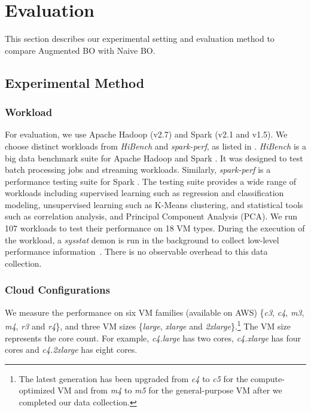 


\section{Evaluation}
\label{sec:evaluation}

This section describes our experimental setting and evaluation method to compare Augmented BO with Naive BO.
\subsection{Experimental Method}
\label{sec:experiment}

\subsubsection*{Workload}
For evaluation, we use Apache Hadoop (v2.7) and Spark (v2.1 and v1.5).
We choose distinct workloads from \emph{HiBench} and \emph{spark-perf}, as listed in \mytable{\ref{tab:dataset}}.
\emph{HiBench} is a big data benchmark suite for Apache Hadoop and Spark \cite{hibench}.
It was designed to test batch processing jobs and streaming workloads. Similarly, \emph{spark-perf} is a performance testing suite for Spark \cite{sparkperf}.
The testing suite provides a wide range of workloads including
supervised learning such as regression and classification modeling,
unsupervised learning such as K-Means clustering,
and statistical tools such as correlation analysis, and Principal Component Analysis (PCA).
We run 107 workloads to test their performance on 18 VM types.
During the execution of the workload, a \emph{sysstat} demon is run in the background to collect low-level performance information~\cite{sysstat}.
There is no observable overhead to this data collection.



\subsubsection*{Cloud Configurations}
We measure the performance on six VM families (available on AWS)
\{\emph{c3}, \emph{c4}, \emph{m3}, \emph{m4}, \emph{r3} and \emph{r4}\}, and
three VM sizes \{\emph{large}, \emph{xlarge} and \emph{2xlarge}\}.\footnote{The latest generation has been upgraded
from \emph{c4} to \emph{c5} for the compute-optimized VM and from \emph{m4} to \emph{m5} for the general-purpose VM
after we completed our data collection.}
The VM size represents the core count.
For example, \emph{c4.large} has two cores,
\emph{c4.xlarge} has four cores and \emph{c4.2xlarge} has eight cores. 

